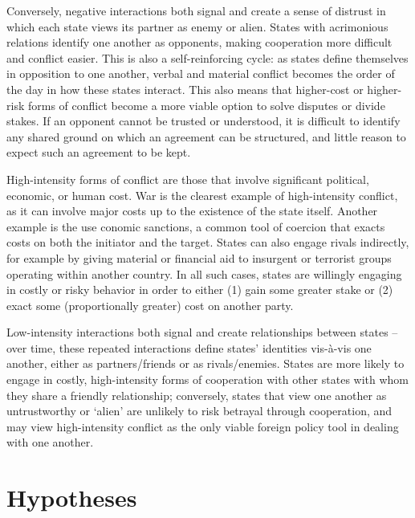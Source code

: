 \documentclass[10pt,]{article}
\let\stdsection\section
\renewcommand\section{\newpage\stdsection}
\begin{document}
Conversely, negative interactions both signal and create a sense of
distrust in which each state views its partner as enemy or alien. States
with acrimonious relations identify one another as opponents, making
cooperation more difficult and conflict easier. This is also a
self-reinforcing cycle: as states define themselves in opposition to one
another, verbal and material conflict becomes the order of the day in
how these states interact. This also means that higher-cost or
higher-risk forms of conflict become a more viable option to solve
disputes or divide stakes. If an opponent cannot be trusted or
understood, it is difficult to identify any shared ground on which an
agreement can be structured, and little reason to expect such an
agreement to be kept.

High-intensity forms of conflict are those that involve significant
political, economic, or human cost. War is the clearest example of
high-intensity conflict, as it can involve major costs up to the
existence of the state itself. Another example is the use conomic
sanctions, a common tool of coercion that exacts costs on both the
initiator and the target. States can also engage rivals indirectly, for
example by giving material or financial aid to insurgent or terrorist
groups operating within another country. In all such cases, states are
willingly engaging in costly or risky behavior in order to either (1)
gain some greater stake or (2) exact some (proportionally greater) cost
on another party.

Low-intensity interactions both signal and create relationships between
states -- over time, these repeated interactions define states'
identities vis-à-vis one another, either as partners/friends or as
rivals/enemies. States are more likely to engage in costly,
high-intensity forms of cooperation with other states with whom they
share a friendly relationship; conversely, states that view one another
as untrustworthy or `alien' are unlikely to risk betrayal through
cooperation, and may view high-intensity conflict as the only viable
foreign policy tool in dealing with one another.

\section{Hypotheses}\label{hypotheses}
\end{document}
